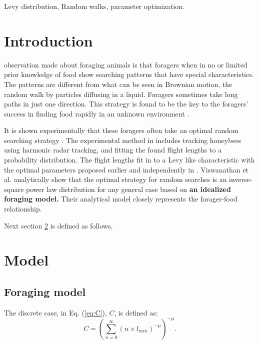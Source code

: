 \documentclass[journal,onecolumn,twoside]{IEEEtran}
\begin{document}
\begin{IEEEkeywords}
Levy distribution, Random walks, parameter optimization.
\end{IEEEkeywords}



\IEEEpeerreviewmaketitle

\tableofcontents

\section{Introduction}


observation made about foraging animals is that foragers when in
no or limited prior knowledge of food show searching patterns that have
special characteristics. The patterns are different from what can be seen in
Brownian motion, the random walk by particles diffusing in a liquid. Foragers
sometimes take long paths in just one direction. This strategy is found to
be the key to the foragers’ success in finding food rapidly in an unknown
environment \cite{reynolds2007honeybees}.

It is shown experimentally that these foragers often take an optimal random searching strategy \cite{reynolds2007honeybees}. 
The experimental method in \cite{reynolds2007honeybees} includes tracking
honeybees using harmonic radar tracking, 
and fitting the found flight lengths
to a probability distribution. 
The flight lengths fit in to a Levy like characteristic with the optimal parameters proposed earlier and independently
in \cite{reynolds2007honeybees, viswanathan1999optimizing}. Viswanathan et al. analytically show that the optimal strategy for
random searches is an inverse-square power law distribution for any general
case based on \textbf{an idealized foraging model.} Their analytical model closely
represents the forager-food relationship. 

Next section \ref{model} is defined as follows.

\section{Model}
\label{model}

\subsection{Foraging model}

The discrete case, in Eq. (\ref{eq:C}), $C$, is defined as:
\begin{equation}
    C = \left( \sum_{n=0}^{\infty} (n \times l_{min})^{-\mu} \right)^{-\mu}.
    \label{eq:C}
\end{equation}
\end{document}
